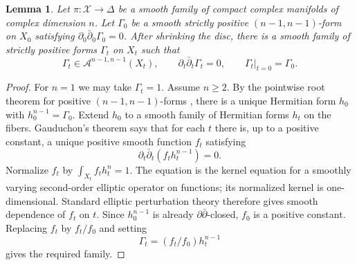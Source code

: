 \documentclass[11pt,letterpaper]{amsart}
\numberwithin{equation}{section}
\newcommand{\cal}{\mathcal}
\def\cX{{\cal X}}
\newtheorem{lemm}[prop]{Lemma}
\begin{document}
\begin{lemm}\label{lem:gauduchon-family}
Let $\pi:\cX\to\Delta$ be a smooth family of compact complex manifolds of
complex dimension $n$. Let $\Gamma_0$ be a smooth strictly positive
$(n-1,n-1)$-form on $X_0$ satisfying
$\partial_0\bar\partial_0\Gamma_0=0$. After shrinking the disc, there is a
smooth family of strictly positive forms $\Gamma_t$ on $X_t$ such that
\[
 \Gamma_t\in\mathcal A^{n-1,n-1}(X_t),\qquad
 \partial_t\bar\partial_t\Gamma_t=0,\qquad
 \Gamma_t|_{t=0}=\Gamma_0.
\]
\end{lemm}
\begin{proof}
For $n=1$ we may take $\Gamma_t=1$. Assume $n\ge2$. By the pointwise root
theorem for positive $(n-1,n-1)$-forms \cite{Michelsohn82}, there is a unique
Hermitian form $h_0$ with $h_0^{n-1}=\Gamma_0$. Extend $h_0$ to a smooth
family of Hermitian forms $h_t$ on the fibers. Gauduchon's theorem
\cite{Gauduchon77} says that for each $t$ there is, up to a positive constant,
a unique positive smooth function $f_t$ satisfying
\[
 \partial_t\bar\partial_t(f_t h_t^{n-1})=0.
\]
Normalize $f_t$ by $\int_{X_t}f_t h_t^n=1$. The equation is the kernel equation
for a smoothly varying second-order elliptic operator on functions; its
normalized kernel is one-dimensional. Standard elliptic perturbation theory
therefore gives smooth dependence of $f_t$ on $t$. Since $h_0^{n-1}$ is
already $\partial\bar\partial$-closed, $f_0$ is a positive constant. Replacing
$f_t$ by $f_t/f_0$ and setting
\[
 \Gamma_t=(f_t/f_0)h_t^{n-1}
\]
gives the required family.
\end{proof}
\end{document}
